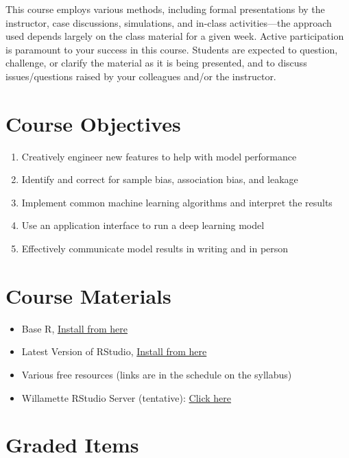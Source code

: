 \documentclass[11pt,]{article}
\providecommand{\tightlist}{%
  \setlength{\itemsep}{0pt}\setlength{\parskip}{0pt}}
\begin{document}
This course employs various methods, including formal presentations by
the instructor, case discussions, simulations, and in-class
activities---the approach used depends largely on the class material for
a given week. Active participation is paramount to your success in this
course. Students are expected to question, challenge, or clarify the
material as it is being presented, and to discuss issues/questions
raised by your colleagues and/or the instructor.

\hypertarget{course-objectives}{%
\section{Course Objectives}\label{course-objectives}}

\begin{enumerate}
\def\labelenumi{\arabic{enumi}.}
\tightlist
\item
  Creatively engineer new features to help with model performance
\item
  Identify and correct for sample bias, association bias, and leakage
\item
  Implement common machine learning algorithms and interpret the results
\item
  Use an application interface to run a deep learning model
\item
  Effectively communicate model results in writing and in person
\end{enumerate}

\hypertarget{course-materials}{%
\section{Course Materials}\label{course-materials}}

\begin{itemize}
\tightlist
\item
  Base R, \href{https://cran.r-project.org/}{Install from here}
\item
  Latest Version of RStudio,
  \href{https://www.rstudio.com/products/rstudio/download}{Install from
  here}
\item
  Various free resources (links are in the schedule on the syllabus)
\item
  Willamette RStudio Server (tentative):
  \href{https://rstudio-ds.willamette.edu/auth-sign-in}{Click here}
\end{itemize}

\hypertarget{graded-items}{%
\section{Graded Items}\label{graded-items}}
\end{document}
